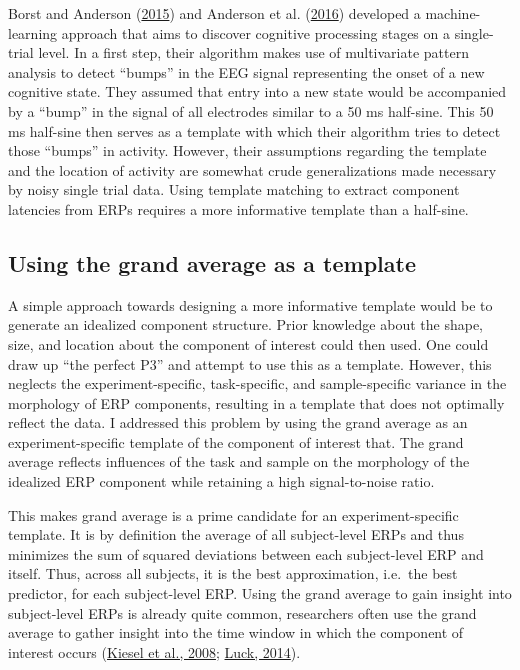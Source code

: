 \documentclass[
  man]{apa7}
\begin{document}
Borst and Anderson (\protect\hyperlink{ref-borst2015discovery}{2015}) and Anderson et al. (\protect\hyperlink{ref-anderson2016discovery}{2016}) developed a machine-learning approach that aims to discover cognitive processing stages on a single-trial level. In a first step, their algorithm makes use of multivariate pattern analysis to detect ``bumps'' in the EEG signal representing the onset of a new cognitive state. They assumed that entry into a new state would be accompanied by a ``bump'' in the signal of all electrodes similar to a 50 ms half-sine. This 50 ms half-sine then serves as a template with which their algorithm tries to detect those ``bumps'' in activity. However, their assumptions regarding the template and the location of activity are somewhat crude generalizations made necessary by noisy single trial data. Using template matching to extract component latencies from ERPs requires a more informative template than a half-sine.

\hypertarget{using-the-grand-average-as-a-template}{%
\subsection{Using the grand average as a template}\label{using-the-grand-average-as-a-template}}

A simple approach towards designing a more informative template would be to generate an idealized component structure. Prior knowledge about the shape, size, and location about the component of interest could then used. One could draw up ``the perfect P3'' and attempt to use this as a template. However, this neglects the experiment-specific, task-specific, and sample-specific variance in the morphology of ERP components, resulting in a template that does not optimally reflect the data. I addressed this problem by using the grand average as an experiment-specific template of the component of interest that. The grand average reflects influences of the task and sample on the morphology of the idealized ERP component while retaining a high signal-to-noise ratio.

This makes grand average is a prime candidate for an experiment-specific template. It is by definition the average of all subject-level ERPs and thus minimizes the sum of squared deviations between each subject-level ERP and itself. Thus, across all subjects, it is the best approximation, i.e.~the best predictor, for each subject-level ERP. Using the grand average to gain insight into subject-level ERPs is already quite common, researchers often use the grand average to gather insight into the time window in which the component of interest occurs (\protect\hyperlink{ref-kiesel2008measurement}{Kiesel et al., 2008}; \protect\hyperlink{ref-luck2014introduction}{Luck, 2014}).
\end{document}

